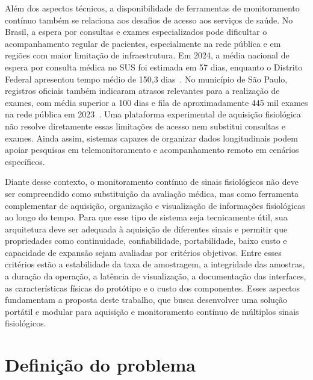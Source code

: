 \documentclass[a4paper,12pt]{fcte}
\begin{document}
Além dos aspectos técnicos, a disponibilidade de ferramentas de monitoramento contínuo também se relaciona aos desafios de acesso aos serviços de saúde. No Brasil, a espera por consultas e exames especializados pode dificultar o acompanhamento regular de pacientes, especialmente na rede pública e em regiões com maior limitação de infraestrutura. Em 2024, a média nacional de espera por consulta médica no SUS foi estimada em 57 dias, enquanto o Distrito Federal apresentou tempo médio de 150,3 dias~\cite{piaui_espera_consultas_2025}. No município de São Paulo, registros oficiais também indicaram atrasos relevantes para a realização de exames, com média superior a 100 dias e fila de aproximadamente 445 mil exames na rede pública em 2023~\cite{tcmsp_fila_exames_2025}. Uma plataforma experimental de aquisição fisiológica não resolve diretamente essas limitações de acesso nem substitui consultas e exames. Ainda assim, sistemas capazes de organizar dados longitudinais podem apoiar pesquisas em telemonitoramento e acompanhamento remoto em cenários específicos.

Diante desse contexto, o monitoramento contínuo de sinais fisiológicos não deve ser compreendido como substituição da avaliação médica, mas como ferramenta complementar de aquisição, organização e visualização de informações fisiológicas ao longo do tempo. Para que esse tipo de sistema seja tecnicamente útil, sua arquitetura deve ser adequada à aquisição de diferentes sinais e permitir que propriedades como continuidade, confiabilidade, portabilidade, baixo custo e capacidade de expansão sejam avaliadas por critérios objetivos. Entre esses critérios estão a estabilidade da taxa de amostragem, a integridade das amostras, a duração da operação, a latência de visualização, a documentação das interfaces, as características físicas do protótipo e o custo dos componentes. Esses aspectos fundamentam a proposta deste trabalho, que busca desenvolver uma solução portátil e modular para aquisição e monitoramento contínuo de múltiplos sinais fisiológicos.

\section{Definição do problema}
\end{document}
